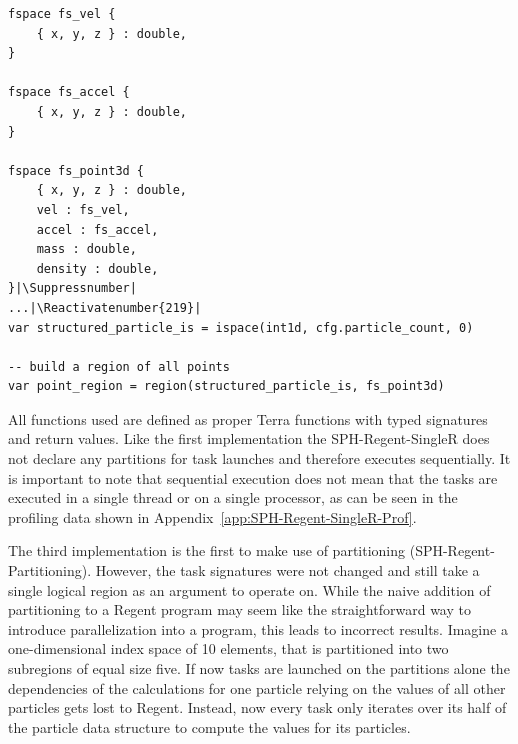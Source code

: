 \documentclass{article}      %
\begin{document}
\let\origthelstnumber\thelstnumber%
\makeatletter
\newcommand*\Suppressnumber{%
  \lst@AddToHook{OnNewLine}{%
    \let\thelstnumber\relax%
  }%
}

\newcommand\Reactivatenumber[1]{%
  \global\c@lstnumber#1%
  \global\advance\c@lstnumber\m@ne\relax%
  \lst@AddToHook{OnNewLine}{%
  \let\thelstnumber\origthelstnumber%
  }%
}
\makeatother

\lstset{
	captionpos=b,
	style=regent,
	basicstyle=\scriptsize,
	numbers=left,
	numberstyle=\tiny,
	columns=fullflexible,
	firstnumber=13,
	stepnumber=1,
	escapeinside=||,
}
\begin{lstlisting}[frame=single,label={lst:fs_space},
	caption={Field space declaration in SPH-Regent-SingleR}]
fspace fs_vel {
	{ x, y, z } : double,
}

fspace fs_accel {
	{ x, y, z } : double,
}

fspace fs_point3d {
	{ x, y, z } : double,
	vel : fs_vel,
	accel : fs_accel,
	mass : double,
	density : double,
}|\Suppressnumber|
...|\Reactivatenumber{219}|
var structured_particle_is = ispace(int1d, cfg.particle_count, 0) 

-- build a region of all points
var point_region = region(structured_particle_is, fs_point3d)
\end{lstlisting}
All functions used are defined as proper Terra functions with typed signatures and return values. Like the first implementation the SPH-Regent-SingleR does not declare any partitions for task launches and therefore executes sequentially. It is important to note that sequential execution does not mean that the tasks are executed in a single thread or on a single processor, as can be seen in the profiling data shown in Appendix~\ref{app:SPH-Regent-SingleR-Prof}.

The third implementation is the first to make use of partitioning (SPH-Regent-Partitioning). However, the task signatures were not changed and still take a single logical region as an argument to operate on. While the naive addition of partitioning to a Regent program may seem like the straightforward way to introduce parallelization into a program, this leads to incorrect results. Imagine a one-dimensional index space of 10 elements, that is partitioned into two subregions of equal size five. If now tasks are launched on the partitions alone the dependencies of the calculations for one particle relying on the values of all other particles gets lost to Regent. Instead, now every task only iterates over its half of the particle data structure to compute the values for its particles. 
\end{document}
